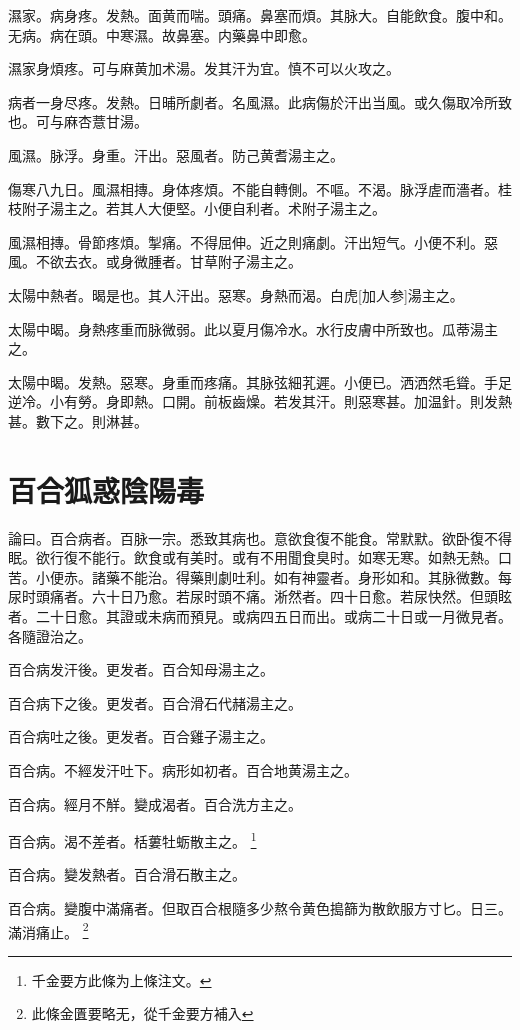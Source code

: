 \documentclass[12pt,twoside,UTF8,b5paper]{ctexbook}
\begin{document}
濕家。病身疼。发熱。面黄而喘。頭痛。鼻塞而煩。其脉大。自能飲食。腹中和。无病。病在頭。中寒濕。故鼻塞。内藥鼻中即愈。

濕家身煩疼。可与麻黄加术湯。发其汗为宜。慎不可以火攻之。

病者一身尽疼。发熱。日晡所劇者。名風濕。此病傷於汗出当風。或久傷取冷所致也。可与麻杏薏甘湯。

風濕。脉浮。身重。汗出。惡風者。防己黄耆湯主之。

傷寒八九日。風濕相摶。身体疼煩。不能自轉側。不嘔。不渴。脉浮虗而濇者。桂枝附子湯主之。若其人大便堅。小便自利者。术附子湯主之。

風濕相摶。骨節疼煩。掣痛。不得屈伸。近之則痛劇。汗出短气。小便不利。惡風。不欲去衣。或身微腫者。甘草附子湯主之。

太陽中熱者。暍是也。其人汗出。惡寒。身熱而渴。白虎[加人参]湯主之。

太陽中暍。身熱疼重而脉微弱。此以夏月傷冷水。水行皮膚中所致也。瓜蒂湯主之。

太陽中暍。发熱。惡寒。身重而疼痛。其脉弦細芤遲。小便已。洒洒然毛聳。手足逆冷。小有勞。身即熱。口開。前板齒燥。若发其汗。則惡寒甚。加温針。則发熱甚。數下之。則淋甚。

\chapter{百合狐惑陰陽毒}

論曰。百合病者。百脉一宗。悉致其病也。意欲食復不能食。常默默。欲卧復不得眠。欲行復不能行。飲食或有美时。或有不用聞食臭时。如寒无寒。如熱无熱。口苦。小便赤。諸藥不能治。得藥則劇吐利。如有神靈者。身形如和。其脉微數。每尿时頭痛者。六十日乃愈。若尿时頭不痛。淅然者。四十日愈。若尿快然。但頭眩者。二十日愈。其證或未病而預見。或病四五日而出。或病二十日或一月微見者。各隨證治之。

百合病发汗後。更发者。百合知母湯主之。

百合病下之後。更发者。百合滑石代赭湯主之。

百合病吐之後。更发者。百合雞子湯主之。

百合病。不經发汗吐下。病形如初者。百合地黄湯主之。

百合病。經月不觧。變成渴者。百合洗方主之。

百合病。渴不差者。栝蔞牡蛎散主之。
	\footnote{千金要方此條为上條注文。}

百合病。變发熱者。百合滑石散主之。

百合病。變腹中滿痛者。但取百合根隨多少熬令黄色搗篩为散飲服方寸匕。日三。滿消痛止。
	\footnote{此條金匱要略无，從千金要方補入}
\end{document}

